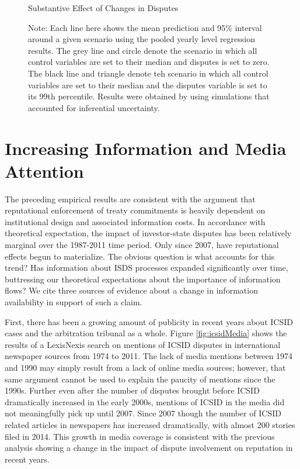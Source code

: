 \documentclass[12pt,onesided]{amsart}
\begin{document}
\begin{figure}[ht]
	\vspace{4cm}
	\centering
	\caption{Substantive Effect of Changes in Disputes}
	\label{fig:dispEffectYearSim}
	\resizebox{1\textwidth}{!}{}
	\caption*{Note: Each line here shows the mean prediction and 95\% interval around a given scenario using the pooled yearly level regression results. The grey line and circle denote the scenario in which all control variables are set to their median and disputes is set to zero. The black line and triangle denote teh scenario in which all control variables are set to their median and the disputes variable is set to its 99th percentile. Results were obtained by using simulations that accounted for inferential uncertainty. }
\end{figure}


\section*{Increasing Information and Media Attention}

The preceding empirical results are consistent with the argument that reputational enforcement of treaty commitments is heavily dependent on institutional design and associated information costs. In accordance with theoretical expectation, the impact of investor-state disputes has been relatively marginal over the 1987-2011 time period. Only since 2007, have reputational effects begun to materialize. The obvious question is what accounts for this trend? Has information about ISDS processes expanded significantly over time, buttressing our theoretical expectations about the importance of information flows? We cite three sources of evidence about a change in information availability in support of such a claim. 

First, there has been a growing amount of publicity in recent years about ICSID cases and the arbitration tribunal as a whole. Figure \ref{fig:icsidMedia} shows the results of a LexisNexis search on mentions of ICSID disputes in international newspaper sources from 1974 to 2011. The lack of media mentions between 1974 and 1990 may simply result from a lack of online media sources; however, that same argument cannot be used to explain the paucity of mentions since the 1990s. Further even after the number of disputes brought before ICSID dramatically increased in the early 2000s, mentions of ICSID in the media did not meaningfully pick up until 2007. Since 2007 though the number of ICSID related articles in newspapers has increased dramatically, with almost 200 stories filed in 2014. This growth in media coverage is consistent with the previous analysis showing a change in the impact of dispute involvement on reputation in recent years.
\end{document}

